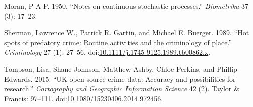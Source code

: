 \documentclass[]{article}
\begin{document}
\hypertarget{ref-Moran1950}{}
Moran, P A P. 1950. ``Notes on continuous stochastic processes.''
\emph{Biometrika} 37 (3): 17--23.

\hypertarget{ref-Sherman1989}{}
Sherman, Lawrence W., Patrick R. Gartin, and Michael E. Buerger. 1989.
``Hot spots of predatory crime: Routine activities and the criminology
of place.'' \emph{Criminology} 27 (1): 27--56.
doi:\href{https://doi.org/10.1111/j.1745-9125.1989.tb00862.x}{10.1111/j.1745-9125.1989.tb00862.x}.

\hypertarget{ref-Tompson2015}{}
Tompson, Lisa, Shane Johnson, Matthew Ashby, Chloe Perkins, and Phillip
Edwards. 2015. ``UK open source crime data: Accuracy and possibilities
for research.'' \emph{Cartography and Geographic Information Science} 42
(2). Taylor \& Francis: 97--111.
doi:\href{https://doi.org/10.1080/15230406.2014.972456}{10.1080/15230406.2014.972456}.
\end{document}
